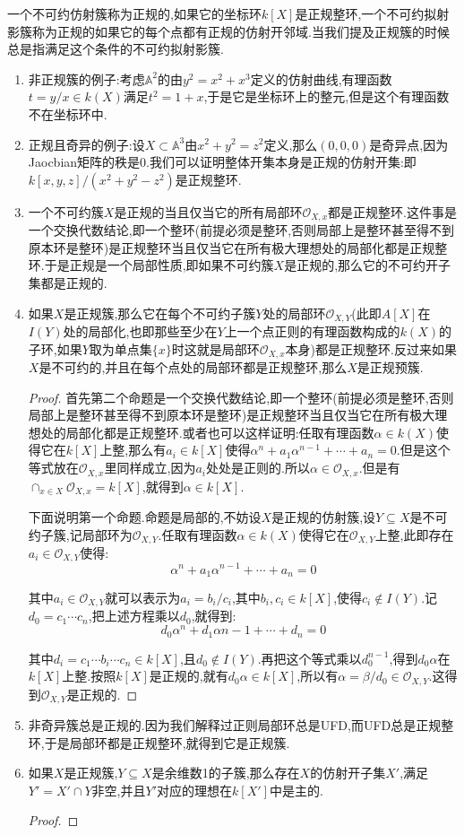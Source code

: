 一个不可约仿射簇称为正规的,如果它的坐标环$k[X]$是正规整环,一个不可约拟射影簇称为正规的如果它的每个点都有正规的仿射开邻域.当我们提及正规簇的时候总是指满足这个条件的不可约拟射影簇.
\begin{enumerate}
	\item 非正规簇的例子:考虑$\mathbb{A}^2$的由$y^2=x^2+x^3$定义的仿射曲线,有理函数$t=y/x\in k(X)$满足$t^2=1+x$,于是它是坐标环上的整元,但是这个有理函数不在坐标环中.
	\item 正规且奇异的例子:设$X\subset\mathbb{A}^3$由$x^2+y^2=z^2$定义,那么$(0,0,0)$是奇异点,因为Jaocbian矩阵的秩是0.我们可以证明整体开集本身是正规的仿射开集:即$k[x,y,z]/(x^2+y^2-z^2)$是正规整环.
	\item 一个不可约簇$X$是正规的当且仅当它的所有局部环$\mathscr{O}_{X,x}$都是正规整环.这件事是一个交换代数结论,即一个整环(前提必须是整环,否则局部上是整环甚至得不到原本环是整环)是正规整环当且仅当它在所有极大理想处的局部化都是正规整环.于是正规是一个局部性质,即如果不可约簇$X$是正规的,那么它的不可约开子集都是正规的.
	\item 如果$X$是正规簇,那么它在每个不可约子簇$Y$处的局部环$\mathscr{O}_{X,Y}$(此即$A[X]$在$I(Y)$处的局部化,也即那些至少在$Y$上一个点正则的有理函数构成的$k(X)$的子环,如果$Y$取为单点集$\{x\}$时这就是局部环$\mathscr{O}_{X,x}$本身)都是正规整环.反过来如果$X$是不可约的,并且在每个点处的局部环都是正规整环,那么$X$是正规预簇.
	\begin{proof}
		
		首先第二个命题是一个交换代数结论,即一个整环(前提必须是整环,否则局部上是整环甚至得不到原本环是整环)是正规整环当且仅当它在所有极大理想处的局部化都是正规整环.或者也可以这样证明:任取有理函数$\alpha\in k(X)$使得它在$k[X]$上整,那么有$a_i\in k[X]$使得$\alpha^n+a_1\alpha^{n-1}+\cdots+a_n=0$.但是这个等式放在$\mathscr{O}_{X,x}$里同样成立,因为$a_i$处处是正则的.所以$\alpha\in\mathscr{O}_{X,x}$.但是有$\cap_{x\in X}\mathscr{O}_{X,x}=k[X]$,就得到$\alpha\in k[X]$.
		
		\qquad
		
		下面说明第一个命题.命题是局部的,不妨设$X$是正规的仿射簇,设$Y\subseteq X$是不可约子簇,记局部环为$\mathscr{O}_{X,Y}$.任取有理函数$\alpha\in k(X)$使得它在$\mathscr{O}_{X,Y}$上整,此即存在$a_i\in\mathscr{O}_{X,Y}$使得:
		$$\alpha^n+a_1\alpha^{n-1}+\cdots+a_n=0$$
		
		其中$a_i\in\mathscr{O}_{X,Y}$就可以表示为$a_i=b_i/c_i$,其中$b_i,c_i\in k[X]$,使得$c_i\not\in I(Y)$.记$d_0=c_1\cdots c_n$,把上述方程乘以$d_0$,就得到:
		$$d_0\alpha^n+d_1\alpha{n-1}+\cdots+d_n=0$$
		
		其中$d_i=c_1\cdots b_i\cdots c_n\in k[X]$,且$d_0\not\in I(Y)$.再把这个等式乘以$d_0^{n-1}$,得到$d_0\alpha$在$k[X]$上整.按照$k[X]$是正规的,就有$d_0\alpha\in k[X]$,所以有$\alpha=\beta/d_0\in\mathscr{O}_{X,Y}$.这得到$\mathscr{O}_{X,Y}$是正规的.
	\end{proof}
	\item 非奇异簇总是正规的.因为我们解释过正则局部环总是UFD,而UFD总是正规整环,于是局部环都是正规整环,就得到它是正规簇.
	\item 如果$X$是正规簇,$Y\subseteq X$是余维数1的子簇,那么存在$X$的仿射开子集$X'$,满足$Y'=X'\cap Y$非空,并且$Y'$对应的理想在$k[X']$中是主的.
	\begin{proof}
		

\end{proof}
\end{enumerate}
